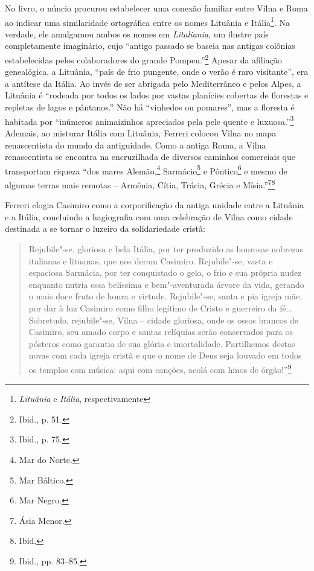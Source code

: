 No livro, o núncio procurou estabelecer uma conexão familiar entre Vilna
e Roma ao indicar uma similaridade ortográfica entre os nomes Lituânia e
Itália\footnote{\textit{Lituânia} e \textit{Itália}, respectivamente}. Na verdade,
ele amalgamou ambos os nomes em \textit{Litaliania}, um ilustre país
completamente imaginário, cujo ``antigo passado se baseia nas antigas
colônias estabelecidas pelos colaboradores do grande Pompeu.''\footnote{Ibid.,
  p. 51.} Apesar da afiliação genealógica, a Lituânia, ``país de frio
pungente, onde o verão é raro visitante'', era a antítese da Itália. Ao
invés de ser abrigada pelo Mediterrâneo e pelos Alpes, a Lituânia é
``rodeada por todos os lados por vastas planícies cobertas de florestas
e repletas de lagos e pântanos.'' Não há ``vinhedos ou pomares'', mas a
floresta é habitada por ``inúmeros animaizinhos apreciados pela pele
quente e luxuosa.''\footnote{Ibid., p. 75.} Ademais, ao misturar Itália
com Lituânia, Ferreri colocou Vilna no mapa renascentista do mundo da
antiguidade. Como a antiga Roma, a Vilna renascentista se encontra na
encruzilhada de diversos caminhos comerciais que transportam riqueza
``dos mares Alemão,\footnote{Mar do Norte.} Sarmácio\footnote{Mar Báltico.} e Pôntico\footnote{Mar Negro.} 
e mesmo de algumas terras mais remotas -- Armênia, Cítia,
Trácia, Grécia e Mísia.''\footnote{Ásia Menor.}\footnote{Ibid.}

Ferreri elogia Casimiro como a corporificação da antiga unidade entre a
Lituânia e a Itália, concluindo a hagiografia com uma celebração de
Vilna como cidade destinada a se tornar o luzeiro da solidariedade
cristã:

\begin{quote}
Rejubile"-se, gloriosa e bela Itália, por ter produzido as honrosas
nobrezas italianas e lituanas, que nos deram Casimiro. Rejubile"-se,
vasta e espaciosa Sarmácia, por ter conquistado o gelo, o frio e sua
própria nudez enquanto nutria essa belíssima e bem"-aventurada árvore da
vida, gerando o mais doce fruto de honra e virtude. Rejubile"-se, santa e
pia igreja mãe, por dar à luz Casimiro como filho legítimo de Cristo e
guerreiro da fé\ldots{} Sobretudo, rejubile"-se, Vilna -- cidade gloriosa,
onde os ossos brancos de Casimiro, seu amado corpo e santas relíquias
serão conservados para os pósteros como garantia de sua glória e
imortalidade. Partilhemos destas novas com cada igreja cristã e que o
nome de Deus seja louvado em todos os templos com música: aqui com
canções, acolá com hinos de órgão!''\footnote{Ibid., pp. 83--85.}
\end{quote}

